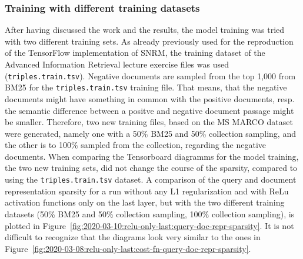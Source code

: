 \subsubsection*{Training with different training datasets}
After having discussed the work and the results, the model training was tried with two different
    training sets.
As already previously used for the reproduction of the TensorFlow implementation of SNRM, the training 
    dataset of the Advanced Information Retrieval lecture exercise files was used (\texttt{triples.train.tsv}).
Negative documents are sampled from the top 1,000 from BM25 for the \texttt{triples.train.tsv} training file.
That means, that the negative documents might have something in common with the positive documents,
    resp. the semantic difference between a positve and negative document passage might be smaller.
Therefore, two new training files, based on the MS MARCO dataset were generated, namely 
    one with a 50\% BM25 and 50\% collection sampling, and the other is to 100\% sampled from the collection,
    regarding the negative documents.
When comparing the Tensorboard diagramms for the model training, the two new training sets,
    did not change the course of the sparsity, compared to using the \texttt{triples.train.tsv} dataset.
A comparison of the query and document representation sparsity for a run without any L1 regularization
    and with ReLu activation functions only on the last layer,
    but with the two different training datasets
    (50\% BM25 and 50\% collection sampling, 100\% collection sampling),
    is plotted in Figure~\ref{fig:2020-03-10:relu-only-last:query-doc-repr-sparsity}.
It is not difficult to recognize that the diagrams look very similar to the ones in 
    Figure~\ref{fig:2020-03-08:relu-only-last:cost-fn-query-doc-repr-sparsity}.

